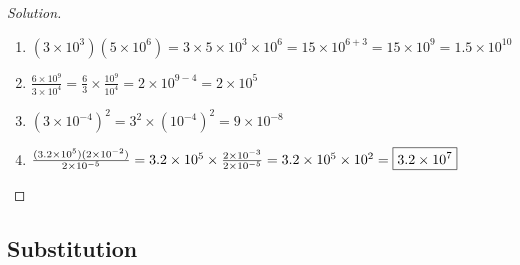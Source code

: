 \documentclass[crop=false,class=book,oneside]{standalone}
\begin{document}
                \begin{proof}[Solution]
                    \
                    \begin{enumerate}
                        \item $(3\times 10^{3})(5\times 10^{6})=%
                            3\times 5\times 10^{3}\times 10^{6}=%
                            15\times 10^{6+3}=%
                            15\times 10^{9}=%
                            \boxed{1.5\times 10^{10}}$
                        \item $\frac{6\times 10^{9}}{3\times 10^{4}}=%
                            \frac{6}{3}\times\frac{10^{9}}{10^{4}}=%
                            2\times 10^{9-4}=%
                            \boxed{2\times 10^{5}}$
                        \item $(3\times 10^{-4})^{2}=%
                            3^{2}\times (10^{-4})^{2}=%
                            \boxed{9\times 10^{-8}}$
                        \item 
                            $\frac{%
                                (3.2\times 10^{5})(2\times 10^{-2})%
                            }{%
                                2\times 10^{-5}%
                            }=%
                            3.2\times 10^{5}\times%
                            \frac{%
                                2\times 10^{-3}%
                            }{%
                                2\times 10^{-5}%
                            }=%
                            3.2\times 10^{5}\times 10^{2}=%
                            \boxed{3.2\times 10^{7}}$
                    \end{enumerate}
                \end{proof}
        \subsection{Substitution}
\end{document}
